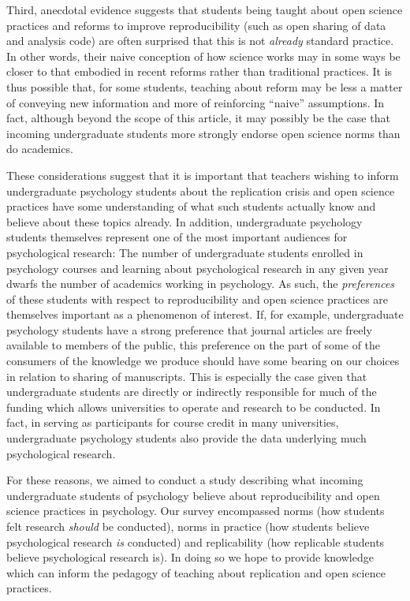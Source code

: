 \documentclass[
  english,
  man,mask,floatsintext]{apa6}
\begin{document}
Third, anecdotal evidence suggests that students being taught about open science practices and reforms to improve reproducibility (such as open sharing of data and analysis code) are often surprised that this is not \emph{already} standard practice. In other words, their naive conception of how science works may in some ways be closer to that embodied in recent reforms rather than traditional practices. It is thus possible that, for some students, teaching about reform may be less a matter of conveying new information and more of reinforcing \enquote{naive} assumptions. In fact, although beyond the scope of this article, it may possibly be the case that incoming undergraduate students more strongly endorse open science norms than do academics.

These considerations suggest that it is important that teachers wishing to inform undergraduate psychology students about the replication crisis and open science practices have some understanding of what such students actually know and believe about these topics already. In addition, undergraduate psychology students themselves represent one of the most important audiences for psychological research: The number of undergraduate students enrolled in psychology courses and learning about psychological research in any given year dwarfs the number of academics working in psychology. As such, the \emph{preferences} of these students with respect to reproducibility and open science practices are themselves important as a phenomenon of interest. If, for example, undergraduate psychology students have a strong preference that journal articles are freely available to members of the public, this preference on the part of some of the consumers of the knowledge we produce should have some bearing on our choices in relation to sharing of manuscripts. This is especially the case given that undergraduate students are directly or indirectly responsible for much of the funding which allows universities to operate and research to be conducted. In fact, in serving as participants for course credit in many universities, undergraduate psychology students also provide the data underlying much psychological research.

For these reasons, we aimed to conduct a study describing what incoming undergraduate students of psychology believe about reproducibility and open science practices in psychology. Our survey encompassed norms (how students felt research \emph{should} be conducted), norms in practice (how students believe psychological research \emph{is} conducted) and replicability (how replicable students believe psychological research is). In doing so we hope to provide knowledge which can inform the pedagogy of teaching about replication and open science practices.
\end{document}
